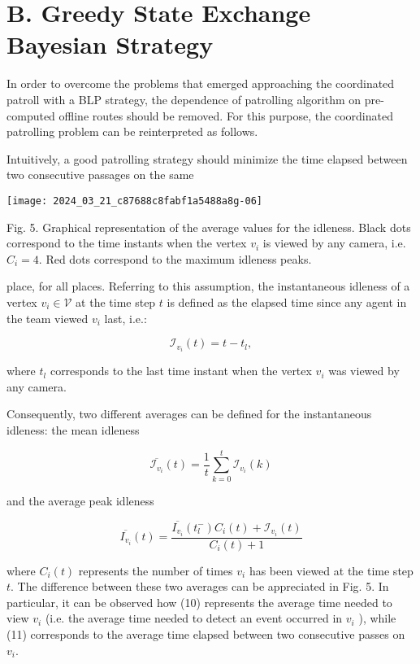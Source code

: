 \documentclass[conference]{IEEEtran}
\begin{document}
\section*{B. Greedy State Exchange Bayesian Strategy}
In order to overcome the problems that emerged approaching the coordinated patroll with a BLP strategy, the dependence of patrolling algorithm on pre-computed offline routes should be removed. For this purpose, the coordinated patrolling problem can be reinterpreted as follows.

Intuitively, a good patrolling strategy should minimize the time elapsed between two consecutive passages on the same

\begin{center}
\texttt{[image: 2024\_03\_21\_c87688c8fabf1a5488a8g-06]}
\end{center}

Fig. 5. Graphical representation of the average values for the idleness. Black dots correspond to the time instants when the vertex $v_{i}$ is viewed by any camera, i.e. $C_{i}=4$. Red dots correspond to the maximum idleness peaks.

place, for all places. Referring to this assumption, the instantaneous idleness of a vertex $v_{i} \in \mathcal{V}$ at the time step $t$ is defined as the elapsed time since any agent in the team viewed $v_{i}$ last, i.e.:


\begin{equation*}
\mathcal{I}_{v_{i}}(t)=t-t_{l}, \tag{9}
\end{equation*}


where $t_{l}$ corresponds to the last time instant when the vertex $v_{i}$ was viewed by any camera.

Consequently, two different averages can be defined for the instantaneous idleness: the mean idleness


\begin{equation*}
\overline{\mathcal{I}_{v_{i}}}(t)=\frac{1}{t} \sum_{k=0}^{t} \mathcal{I}_{v_{i}}(k) \tag{10}
\end{equation*}


and the average peak idleness


\begin{equation*}
\overline{I_{v_{i}}}(t)=\frac{\overline{I_{v_{i}}}\left(t_{l}^{-}\right) C_{i}(t)+\mathcal{I}_{v_{i}}(t)}{C_{i}(t)+1} \tag{11}
\end{equation*}


where $C_{i}(t)$ represents the number of times $v_{i}$ has been viewed at the time step $t$. The difference between these two averages can be appreciated in Fig. 5. In particular, it can be observed how (10) represents the average time needed to view $v_{i}$ (i.e. the average time needed to detect an event occurred in $v_{i}$ ), while (11) corresponds to the average time elapsed between two consecutive passes on $v_{i}$.
\end{document}
